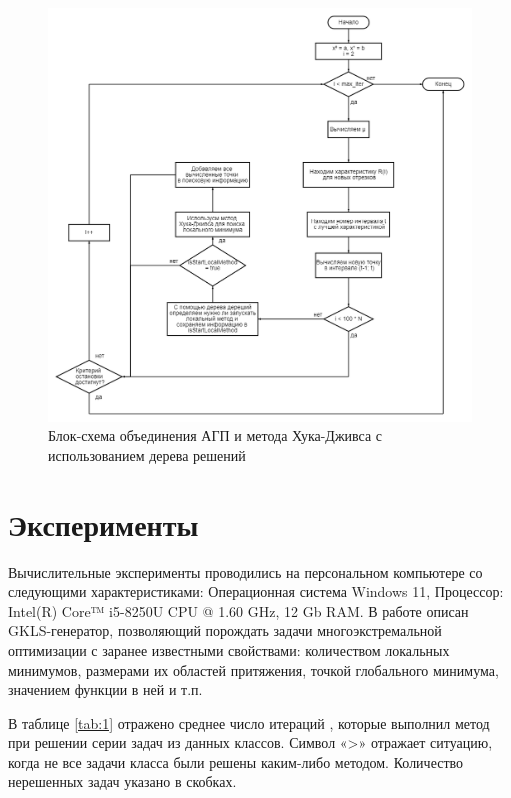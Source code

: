 \documentclass[12pt, a4paper, russian]{article}
\begin{document}
\begin{figure}[ht!]

	\begin{center}
		\begin{minipage}[h]{0.9\linewidth}
			\includegraphics[width=1\linewidth]{figure/fig3.png}
			\caption{Блок-схема объединения АГП и метода Хука-Дживса с использованием дерева решений} %
			\label{fig:fig3}
		\end{minipage}
	\end{center}
\end{figure}	

\section{Эксперименты}

Вычислительные эксперименты проводились на персональном компьютере со следующими характеристиками: Операционная система Windows 11,  Процессор: Intel(R) Core™ i5-8250U CPU @ 1.60 GHz, 12 Gb RAM.
В работе \cite{fio_bib13, fio_bib17} описан GKLS-генератор, позволяющий порождать задачи многоэкстремальной оптимизации с заранее известными свойствами: количеством локальных минимумов, размерами их областей притяжения, точкой глобального минимума, значением функции в ней и т.п.

В таблице \ref{tab:1} отражено среднее число итераций , которые выполнил метод при решении серии задач из данных классов. Символ «>» отражает ситуацию, когда не все задачи класса были решены каким-либо методом. Количество нерешенных задач указано в скобках.
\end{document}
